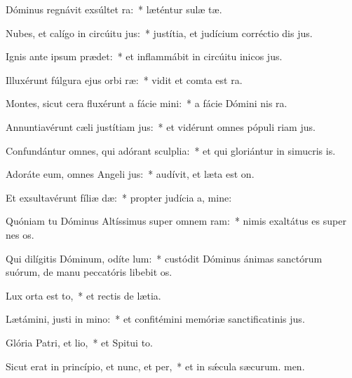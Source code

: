 \item Dóminus regnávit exsúltet ra:~* læténtur sulæ tæ.
\item Nubes, et calígo in circúitu jus:~* justítia, et judícium corréctio dis jus.
\item Ignis ante ipsum prædet:~* et inflammábit in circúitu inicos jus.
\item Illuxérunt fúlgura ejus orbi ræ:~* vidit et comta est ra.
\item Montes, sicut cera fluxérunt a fácie mini:~* a fácie Dómini nis ra.
\item Annuntiavérunt cæli justítiam jus:~* et vidérunt omnes pópuli riam jus.
\item Confundántur omnes, qui adórant sculplia:~* et qui gloriántur in simucris is.
\item Adoráte eum, omnes Angeli jus:~* audívit, et læta est on.
\item Et exsultavérunt fíliæ dæ:~* propter judícia a, mine:
\item Quóniam tu Dóminus Altíssimus super omnem ram:~* nimis exaltátus es super nes os.
\item Qui dilígitis Dóminum, odíte lum:~* custódit Dóminus ánimas sanctórum suórum, de manu peccatóris libebit os.
\item Lux orta est to,~* et rectis de lætia.
\item Lætámini, justi in mino:~* et confitémini memóriæ sanctificatinis jus.
\item Glória Patri, et lio,~* et Spitui to.
\item Sicut erat in princípio, et nunc, et per,~* et in sǽcula sæcurum. men.
